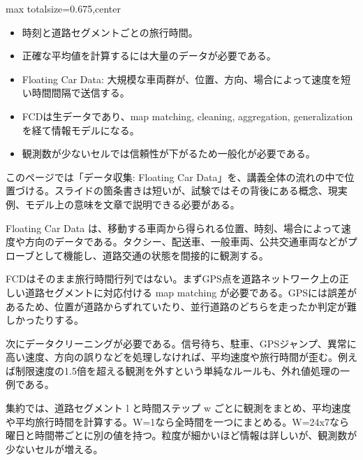 \clearpage
{}
\begin{adjustbox}{max totalsize={\textwidth}{0.675\textheight},center}
\begin{minipage}{\textwidth}\scriptsize
\begin{minipage}[t]{0.485\textwidth}
\begin{itemize}
\item 時刻と道路セグメントごとの旅行時間。
\item 正確な平均値を計算するには大量のデータが必要である。
\item Floating Car Data: 大規模な車両群が、位置、方向、場合によって速度を短い時間間隔で送信する。
\end{itemize}
\begin{itemize}
\item FCDは生データであり、map matching, cleaning, aggregation, generalization を経て情報モデルになる。
\item 観測数が少ないセルでは信頼性が下がるため一般化が必要である。
\end{itemize}
\end{minipage}\hfill
\begin{minipage}[t]{0.485\textwidth}
このページでは「データ収集: Floating Car Data」を、講義全体の流れの中で位置づける。スライドの箇条書きは短いが、試験ではその背後にある概念、現実例、モデル上の意味を文章で説明できる必要がある。\par
Floating Car Data は、移動する車両から得られる位置、時刻、場合によって速度や方向のデータである。タクシー、配送車、一般車両、公共交通車両などがプローブとして機能し、道路交通の状態を間接的に観測する。\par
FCDはそのまま旅行時間行列ではない。まずGPS点を道路ネットワーク上の正しい道路セグメントに対応付ける map matching が必要である。GPSには誤差があるため、位置が道路からずれていたり、並行道路のどちらを走ったか判定が難しかったりする。\par
次にデータクリーニングが必要である。信号待ち、駐車、GPSジャンプ、異常に高い速度、方向の誤りなどを処理しなければ、平均速度や旅行時間が歪む。例えば制限速度の1.5倍を超える観測を外すという単純なルールも、外れ値処理の一例である。\par
集約では、道路セグメント l と時間ステップ w ごとに観測をまとめ、平均速度や平均旅行時間を計算する。W=1なら全時間を一つにまとめる。W=24x7なら曜日と時間帯ごとに別の値を持つ。粒度が細かいほど情報は詳しいが、観測数が少ないセルが増える。\par

\end{minipage}
\end{minipage}
\end{adjustbox}
